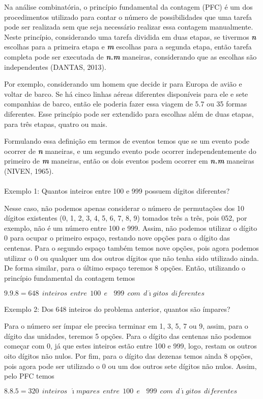 Na análise combinatória, o princípio fundamental da contagem (PFC) é um dos procedimentos utilizado para contar o número de possibilidades que uma tarefa pode ser realizada sem que seja necessário realizar essa contagem manualmente.
Neste princípio, considerando uma tarefa dividida em duas etapas, se tivermos \textbf{\textit{n}} escolhas para a primeira etapa e \textbf{\textit{m}} escolhas para a segunda etapa, então tarefa completa pode ser executada de \textbf{\textit{n.m}} maneiras, considerando que as escolhas são independentes (DANTAS, 2013).

Por exemplo, considerando um homem que decide ir para Europa de avião e voltar de barco. Se há cinco linhas aéreas diferentes disponíveis para ele e sete companhias de barco, então ele poderia fazer essa viagem de 5.7 ou 35 formas diferentes.
Esse princípio pode ser extendido para escolhas além de duas etapas, para três etapas, quatro ou mais.

Formulando essa definição em termos de eventos temos que se um evento pode ocorrer de \textbf{\textit{n}} maneiras, e um segundo evento pode ocorrer independentemente do primeiro de \textbf{\textit{m}} maneiras, então os dois eventos podem ocorrer em \textbf{\textit{n.m}} maneiras (NIVEN, 1965).\\\\
\noindent
Exemplo 1: Quantos inteiros entre 100 e 999 possuem dígitos diferentes?

Nesse caso, não podemos apenas considerar o número de permutações dos 10 dígitos existentes (0, 1, 2, 3, 4, 5, 6, 7, 8, 9) tomados três a três, pois 052, por exemplo, não é um número entre 100 e 999. Assim, não podemos utilizar o dígito 0 para ocupar o primeiro espaço, restando nove opções para o dígito das centenas. Para o segundo espaço também temos nove opções, pois agora podemos utilizar o 0 ou qualquer um dos outros dígitos que não tenha sido utilizado ainda. De forma similar, para o último espaço teremos 8 opções.
Então, utilizando o princípio fundamental da contagem temos 

\begin{center}
	$9.9.8 = 648 \ \ inteiros \ \ entre \ \ 100 \ \ e \ \ \ \ 999 \ \ com \ \ {d\acute{\imath}gitos} \ \ diferentes$ 
\end{center}

\noindent
Exemplo 2: Dos 648 inteiros do problema anterior, quantos são ímpares?

Para o número ser ímpar ele precisa terminar em 1, 3, 5, 7 ou 9, assim, para o dígito das unidades, teremos 5 opções.
Para o dígito das centenas não podemos começar com 0, já que estes inteiros estão entre 100 e 999, logo, restam os outros oito dígitos não nulos.
Por fim, para o dígito das dezenas temos ainda 8 opções, pois agora pode ser utilizado o 0 ou um dos  outros sete dígitos não nulos. Assim, pelo PFC temos
\begin{center}
	$8.8.5 = 320 \ \ inteiros \ \ {\acute{\imath}mpares}\ \ entre \ \ 100 \ \ e \ \ \ \ 999 \ \ com \ \ {d\acute{\imath}gitos} \ \ diferentes$ 
\end{center}


